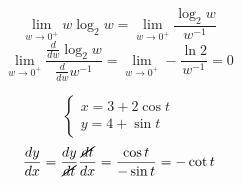 \documentclass{article}
\begin{document}
    \[\lim_{w\to0^+}w\log_{2}w = \lim_{w\to0^+}\frac{\log_{2}w}{w^{-1}}\]
    \[\lim_{w\to0^+}\frac{\frac{d}{dw}\log_{2}w}{\frac{d}{dw}w^{-1}} = \lim_{w\to0^+}-\frac{\ln2}{w^{-1}}=0\]

    \[
    \begin{cases}
        x=3+2\cos t\\
        y=4+\sin t
    \end{cases}\]
    \[\frac{dy}{dx}=\frac{dy}{\cancel{dt}}\frac{\cancel{dt}}{dx}=\frac{\cos t}{-\sin t}=-\cot t\]
\end{document}
